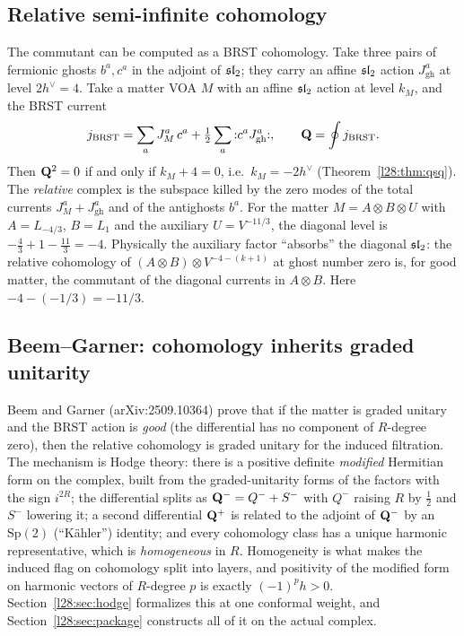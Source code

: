 \subsection{Relative semi-infinite cohomology}

The commutant can be computed as a BRST cohomology. Take three pairs of fermionic ghosts $b^a,c^a$ in the adjoint of
$\mathfrak{sl}_2$; they carry an affine $\mathfrak{sl}_2$ action $J^a_{\mathrm{gh}}$ at level $2h^\vee=4$. Take a matter
VOA $M$ with an affine $\mathfrak{sl}_2$ action at level $k_M$, and the BRST current
\begin{equation*}
j_{\mathrm{BRST}}=\sum_a J^a_M\,c^a+\tfrac12\sum_a{:}c^aJ^a_{\mathrm{gh}}{:},\qquad
\mathbf Q=\oint j_{\mathrm{BRST}}.
\end{equation*}
Then $\mathbf Q^2=0$ if and only if $k_M+4=0$, i.e.\ $k_M=-2h^\vee$ (Theorem~\ref{l28:thm:qsq}). The \emph{relative}
complex is the subspace killed by the zero modes of the total currents $J^a_M+J^a_{\mathrm{gh}}$ and of the antighosts
$b^a$. For the matter $M=A\otimes B\otimes U$ with $A=L_{-4/3}$, $B=L_1$ and the auxiliary $U=V^{-11/3}$, the diagonal
level is $-\tfrac43+1-\tfrac{11}3=-4$. Physically the auxiliary factor ``absorbs'' the diagonal $\mathfrak{sl}_2$: the
relative cohomology of $(A\otimes B)\otimes V^{-4-(k+1)}$ at ghost number zero is, for good matter, the commutant of
the diagonal currents in $A\otimes B$. Here $-4-(-1/3)=-11/3$.

\subsection{Beem--Garner: cohomology inherits graded unitarity}

Beem and Garner (arXiv:2509.10364) prove that if the matter is graded unitary and the BRST action is \emph{good} (the
differential has no component of $R$-degree zero), then the relative cohomology is graded unitary for the induced
filtration. The mechanism is Hodge theory: there is a positive definite \emph{modified} Hermitian form on the complex,
built from the graded-unitarity forms of the factors with the sign $i^{2R}$; the differential splits as
$\mathbf Q^-=Q^-+S^-$ with $Q^-$ raising $R$ by $\tfrac12$ and $S^-$ lowering it; a second differential
$\mathbf Q^+$ is related to the adjoint of $\mathbf Q^-$ by an $\mathrm{Sp}(2)$ (``Kähler'') identity; and
every cohomology class has a unique harmonic representative, which is \emph{homogeneous} in $R$. Homogeneity is what
makes the induced flag on cohomology split into layers, and positivity of the modified form on harmonic vectors of
$R$-degree $p$ is exactly $(-1)^ph>0$. Section~\ref{l28:sec:hodge} formalizes this at one conformal weight, and
Section~\ref{l28:sec:package} constructs all of it on the actual complex.

